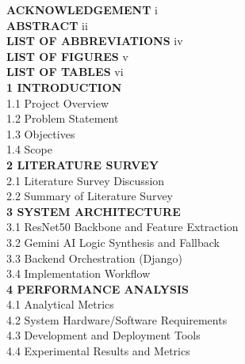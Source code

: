 \documentclass[a4paper,12pt]{report}
\begin{document}
    \textbf{ACKNOWLEDGEMENT} \dotfill i \\
    \textbf{ABSTRACT} \dotfill ii \\
    \textbf{LIST OF ABBREVIATIONS} \dotfill iv \\
    \textbf{LIST OF FIGURES} \dotfill v \\
    \textbf{LIST OF TABLES} \dotfill vi \\[6pt]

    \textbf{1 INTRODUCTION}  \\[3pt]
    \hspace{12mm}1.1 Project Overview  \\
    \hspace{12mm}1.2 Problem Statement  \\
    \hspace{12mm}1.3 Objectives  \\
    \hspace{12mm}1.4 Scope  \\[3pt]

    \textbf{2 LITERATURE SURVEY}  \\[3pt]
    \hspace{12mm}2.1 Literature Survey Discussion  \\
    \hspace{12mm}2.2 Summary of Literature Survey \\[3pt]

    \textbf{3 SYSTEM ARCHITECTURE}  \\[3pt]
    \hspace{12mm}3.1 ResNet50 Backbone and Feature Extraction  \\
    \hspace{12mm}3.2 Gemini AI Logic Synthesis and Fallback  \\
    \hspace{12mm}3.3 Backend Orchestration (Django)  \\
    \hspace{12mm}3.4 Implementation Workflow  \\

    \textbf{4 PERFORMANCE ANALYSIS}  \\[3pt]
    \hspace{12mm}4.1 Analytical Metrics  \\
    \hspace{12mm}4.2 System Hardware/Software Requirements  \\
    \hspace{12mm}4.3 Development and Deployment Tools  \\
    \hspace{12mm}4.4 Experimental Results and Metrics  \\
\end{document}
